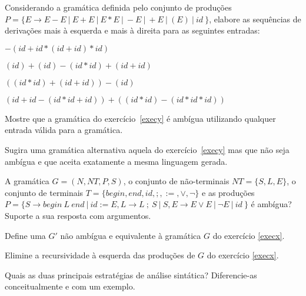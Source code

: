\documentclass{compiladores}
\begin{document}
\begin{listanumerada}
\item
\label{execy}
Considerando a gramática definida pelo conjunto de produções $P = \{ E
\rightarrow E - E\ |\ E + E\ |\ E * E\ |\ -E\ |\ +E\ |\ ( E )\ |\ id\ \}$,
elabore as sequências de derivações mais à esquerda e mais à direita para
as seguintes entradas:
\begin{lista}
\item $-(id+id*(id+id)*id)$
\item $(id)+(id)-(id*id)+(id+id)$
\item $((id*id)+(id+id))-(id)$
\item $(id+id-(id*id+id))+((id*id)-(id*id*id))$
\end{lista}

\item
Mostre que a gramática do exercício~\ref{execy} é ambígua utilizando
qualquer entrada válida para a gramática.

\item
Sugira uma gramática alternativa aquela do exercício~\ref{execy} mas
que não seja ambígua e que aceita exatamente a mesma linguagem gerada.

\item
\label{execx}
A gramática $G = (N, NT, P, S)$, o conjunto de não-terminais $NT = \{
S, L, E \}$, o conjunto de terminais $T = \{ begin, end, id, ;, :=,
\vee, \neg \}$ e as produções $P = \{ S \rightarrow
begin\ L\ end\ |\ id := E, L \rightarrow L\ ;\ S\ |\ S, E \rightarrow
E \vee E\ |\ \neg E\ |\ id\ \}$ é ambígua? Suporte a sua resposta com
argumentos.

\item
Define uma $G'$ não ambígua e equivalente à gramática $G$ do
  exercício \ref{execx}.

\item
Elimine a recursividade à esquerda das produções de $G$ do
  exercício \ref{execx}.

\item
Quais as duas principais estratégias de análise sintática? Diferencie-as conceitualmente e com um exemplo.


\end{listanumerada}
\end{document}
